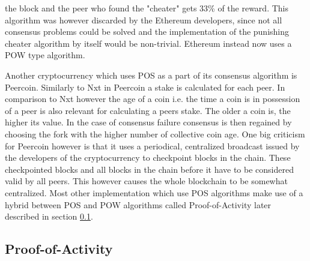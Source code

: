 the block and the peer who found the "cheater" gets 33\% of the reward.\cite{url:eth_slash} This algorithm was however discarded by the Ethereum developers, since not all consensus problems could be
solved and the implementation of the punishing cheater algorithm by itself would be non-trivial.\cite{url:eth_no_slash} Ethereum instead now uses a POW type algorithm.\cite{url:eth_pow}\par Another
cryptocurrency which uses POS as a part of its consensus algorithm is Peercoin. Similarly to Nxt in Peercoin a stake is calculated for each peer. In comparison to Nxt however the age of a coin i.e.
the time a coin is in possession of a peer is also relevant for calculating a peers stake. The older a coin is, the higher its value. In the case of consensus failure consensus is then regained by
choosing the fork with the higher number of collective coin age.\cite{url:peercoin} One big criticism for Peercoin however is that it uses a periodical, centralized broadcast issued by the developers
of the cryptocurrency to checkpoint blocks in the chain. These checkpointed blocks and all blocks in the chain before it have to be considered valid by all peers. This however causes the whole
blockchain to be somewhat centralized. Most other implementation which use POS algorithms make use of a hybrid between POS and POW algorithms called Proof-of-Activity later described in section
\ref{poa}.

\subsection{Proof-of-Activity} \label{poa}

